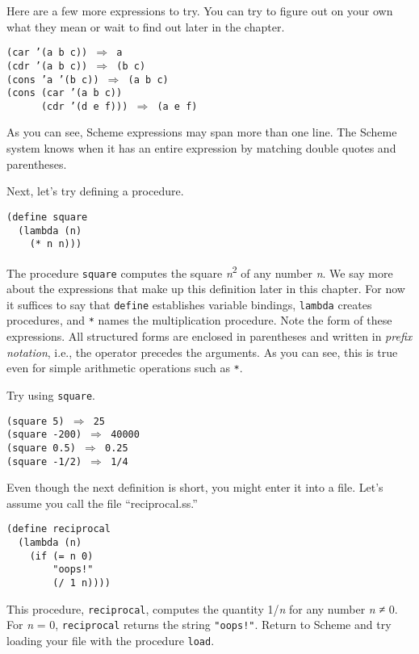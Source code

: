 Here are a few more expressions to try.  You can try to figure out on
your own what they mean or wait to find out later in the chapter.


\begin{alltt}
(car '(a b c)) \(\Rightarrow\) a
(cdr '(a b c)) \(\Rightarrow\) (b c)
(cons 'a '(b c)) \(\Rightarrow\) (a b c)
(cons (car '(a b c))
      (cdr '(d e f))) \(\Rightarrow\) (a e f)
\end{alltt}


As you can see, Scheme expressions may span more than one line.
The Scheme system knows when it has an entire expression by matching
double quotes and parentheses.


Next, let's try defining a procedure\label{start_s2}.


\begin{alltt}
(define square
  (lambda (n)
    (* n n)))
\end{alltt}


The procedure \texttt{square} computes the square \textit{n}\textsuperscript{2} of any number \textit{n}.
We say more about the expressions that make up this definition later in
this chapter.
For now it suffices to say that \texttt{define} establishes variable bindings,
\texttt{lambda} creates procedures, and \texttt{*} names the multiplication
procedure.
Note the form of these expressions.
All structured forms are enclosed in parentheses and written in
\label{start_s3}\textit{prefix notation}, i.e., the operator precedes the arguments.
As you can see, this is true even for simple arithmetic operations such
as \texttt{*}.


Try using \texttt{square}.


\begin{alltt}
(square 5) \(\Rightarrow\) 25
(square -200) \(\Rightarrow\) 40000
(square 0.5) \(\Rightarrow\) 0.25
(square -1/2) \(\Rightarrow\) 1/4
\end{alltt}


Even though the next definition is short, you might enter it into a file.
Let's assume you call the file ``reciprocal.ss.''


\begin{alltt}
(define reciprocal
  (lambda (n)
    (if (= n 0)
        "oops!"
        (/ 1 n))))
\end{alltt}


This procedure, \label{start_s4}\texttt{reciprocal}, computes the quantity 1/\textit{n} for any
number \textit{n} ≠ 0.
For \textit{n} = 0, \texttt{reciprocal} returns the string \texttt{"oops!"}.
Return to Scheme and try loading your file with the procedure \texttt{load}.


